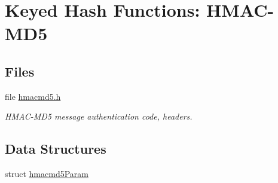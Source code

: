 \hypertarget{group__HMAC__md5__m}{
\section{Keyed Hash Functions: HMAC-MD5}
\label{group__HMAC__md5__m}
}
\subsection*{Files}
\begin{CompactItemize}
\item 
file \hyperlink{hmacmd5_8h}{hmacmd5.h}
\begin{CompactList}\small\item\em HMAC-MD5 message authentication code, headers. \item\end{CompactList}

\end{CompactItemize}
\subsection*{Data Structures}
\begin{CompactItemize}
\item 
struct \hyperlink{structhmacmd5Param}{hmacmd5Param}
\end{CompactItemize}
